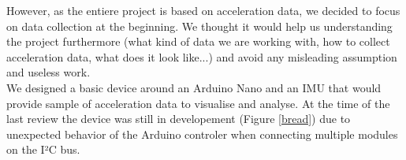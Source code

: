 However, as the entiere project is based on acceleration data, we decided to focus on data collection at the beginning. We thought it would help us understanding the project furthermore (what kind of data we are working with, how to collect acceleration data, what does it look like...) and avoid any misleading assumption and useless work.\\
We designed a basic device around an Arduino Nano and an IMU that would provide sample of acceleration data to visualise and analyse. At the time of the last review the device was still in developement (Figure \ref{bread}) due to unexpected behavior of the Arduino controler when connecting multiple modules on the I²C bus.